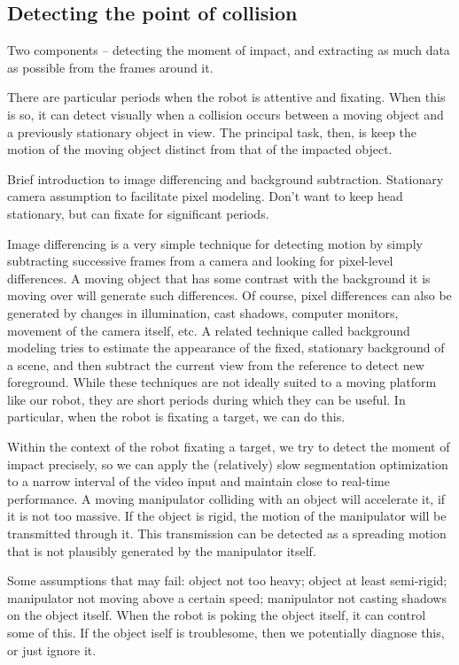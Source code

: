 
\subsection*{Detecting the point of collision}

Two components -- detecting the moment of impact, and extracting as 
much data as possible from the frames around it.

There are particular periods when the robot is attentive and fixating.
When this is so, it can detect visually when a collision occurs
between a moving object and a previously stationary object in view.
The principal task, then, is keep the motion of the moving object distinct
from that of the impacted object.

Brief introduction to image differencing and background subtraction.
Stationary camera assumption to facilitate pixel modeling.  Don't want
to keep head stationary, but can fixate for significant periods.

Image differencing is a very simple technique for detecting motion by
simply subtracting successive frames from a camera and looking for
pixel-level differences.  A moving object that has some contrast with
the background it is moving over will generate such differences.  Of
course, pixel differences can also be generated by changes in
illumination, cast shadows, computer monitors, movement of the camera
itself, etc.  A related technique called background modeling tries to
estimate the appearance of the fixed, stationary background of a 
scene, and then subtract the current view from the reference to 
detect new foreground.  While these techniques are not ideally
suited to a moving platform like our robot, they are short periods 
during which they can be useful.  In particular, when the robot is
fixating a target, we can do this.

Within the context of the robot fixating a target, we try to detect
the moment of impact precisely, so we can apply the (relatively) slow
segmentation optimization to a narrow interval of the video input and
maintain close to real-time performance.  A moving manipulator
colliding with an object will accelerate it, if it is not too massive.
If the object is rigid, the motion of the manipulator will be transmitted 
through it.  This transmission can be detected as a spreading motion
that is not plausibly generated by the manipulator itself.

Some assumptions that may fail: object not too heavy; object at least
semi-rigid; manipulator not moving above a certain speed; manipulator
not casting shadows on the object itself.  When the robot is poking the
object itself, it can control some of this.  If the object iself is
troublesome, then we potentially diagnose this, or just ignore it.

